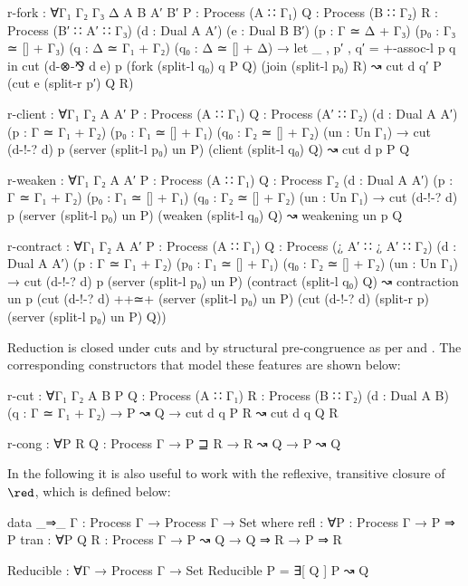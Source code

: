 \begin{AgdaAlign}
\begin{code}[hide]
  r-fork      :
    ∀{Γ₁ Γ₂ Γ₃ Δ A B A′ B′}
    {P : Process (A ∷ Γ₁)} {Q : Process (B ∷ Γ₂)} {R : Process (B′ ∷ A′ ∷ Γ₃)}
    (d : Dual A A′) (e : Dual B B′) (p : Γ ≃ Δ + Γ₃) (p₀ : Γ₃ ≃ [] + Γ₃)
    (q : Δ ≃ Γ₁ + Γ₂) (q₀ : Δ ≃ [] + Δ) →
    let _ , p′ , q′ = +-assoc-l p q in
    cut (d-⊗-⅋ d e) p
        (fork (split-l q₀) q P Q)
        (join (split-l p₀) R) ↝ cut d q′ P (cut e (split-r p′) Q R)

  r-client    :
    ∀{Γ₁ Γ₂ A A′}
    {P : Process (A ∷ Γ₁)} {Q : Process (A′ ∷ Γ₂)} (d : Dual A A′)
    (p : Γ ≃ Γ₁ + Γ₂) (p₀ : Γ₁ ≃ [] + Γ₁) (q₀ : Γ₂ ≃ [] + Γ₂) (un : Un Γ₁) →
    cut (d-!-? d) p
      (server (split-l p₀) un P)
      (client (split-l q₀) Q) ↝ cut d p P Q

  r-weaken    :
    ∀{Γ₁ Γ₂ A A′}
    {P : Process (A ∷ Γ₁)} {Q : Process Γ₂}
    (d : Dual A A′) (p : Γ ≃ Γ₁ + Γ₂) (p₀ : Γ₁ ≃ [] + Γ₁) (q₀ : Γ₂ ≃ [] + Γ₂) (un : Un Γ₁) →
    cut (d-!-? d) p
        (server (split-l p₀) un P)
        (weaken (split-l q₀) Q) ↝ weakening un p Q

  r-contract  :
    ∀{Γ₁ Γ₂ A A′}
    {P : Process (A ∷ Γ₁)} {Q : Process (¿ A′ ∷ ¿ A′ ∷ Γ₂)}
    (d : Dual A A′) (p : Γ ≃ Γ₁ + Γ₂) (p₀ : Γ₁ ≃ [] + Γ₁) (q₀ : Γ₂ ≃ [] + Γ₂) (un : Un Γ₁) →
    cut (d-!-? d) p
      (server (split-l p₀) un P)
      (contract (split-l q₀) Q) ↝
      contraction un p
        (cut (d-!-? d) ++≃+
             (server (split-l p₀) un P)
             (cut (d-!-? d) (split-r p) (server (split-l p₀) un P) Q))
\end{code}

Reduction is closed under cuts and by structural pre-congruence as per \RCut and
\RCong. The corresponding constructors that model these features are shown
below:

\begin{code}
  r-cut       : ∀{Γ₁ Γ₂ A B} {P Q : Process (A ∷ Γ₁)} {R : Process (B ∷ Γ₂)}
                (d : Dual A B) (q : Γ ≃ Γ₁ + Γ₂) → P ↝ Q →
                cut d q P R ↝ cut d q Q R

  r-cong      : ∀{P R Q : Process Γ} → P ⊒ R → R ↝ Q → P ↝ Q
\end{code}
\end{AgdaAlign}
In the following it is also useful to work with the reflexive, transitive
closure of $\red$, which is defined below:

\begin{code}
data _⇒_ {Γ} : Process Γ → Process Γ → Set where
  refl  : ∀{P : Process Γ} → P ⇒ P
  tran  : ∀{P Q R : Process Γ} → P ↝ Q → Q ⇒ R → P ⇒ R
\end{code}

\begin{code}[hide]
Reducible : ∀{Γ} → Process Γ → Set
Reducible P = ∃[ Q ] P ↝ Q
\end{code}
